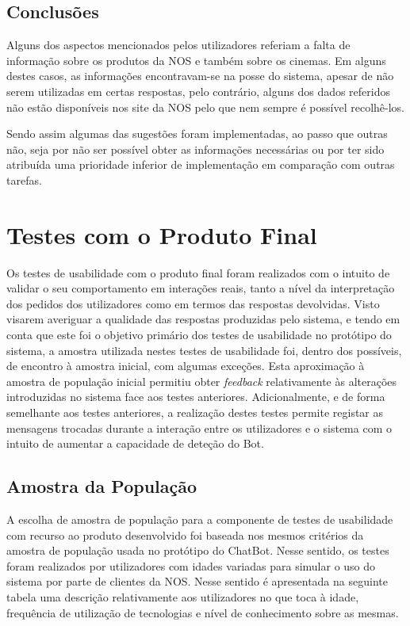 \documentclass[11pt, a4paper]{article}
\begin{document}
\subsection{Conclusões}

Alguns dos aspectos mencionados pelos utilizadores referiam a falta de informação sobre os produtos da NOS e
também sobre os cinemas. Em alguns destes casos, as informações encontravam-se na posse do sistema, apesar
de não serem utilizadas em certas respostas, pelo contrário, alguns dos dados referidos não estão
disponíveis nos site da NOS pelo que nem sempre é possível recolhê-los.

Sendo assim algumas das sugestões foram implementadas, ao passo que outras não, seja por não ser possível
obter as informações necessárias ou por ter sido atribuída uma prioridade inferior de implementação em
comparação com outras tarefas.

\section{Testes com o Produto Final}
Os testes de usabilidade com o produto final foram realizados com o intuito de validar o seu comportamento
em interações reais, tanto a nível da interpretação dos pedidos dos utilizadores como em termos das
respostas devolvidas. Visto visarem averiguar a qualidade das respostas produzidas pelo sistema, e tendo em
conta que este foi o objetivo primário dos testes de usabilidade no protótipo do sistema, a amostra
utilizada nestes testes de usabilidade foi, dentro dos possíveis, de encontro à amostra inicial, com
algumas exceções. Esta aproximação à amostra de população inicial permitiu obter \textit{feedback}
relativamente às alterações introduzidas no sistema face aos testes anteriores. Adicionalmente, e de forma
semelhante aos testes anteriores, a realização destes testes permite registar as mensagens trocadas durante
a interação entre os utilizadores e o sistema com o intuito de aumentar a capacidade de deteção do Bot.

\subsection{Amostra da População}

A escolha de amostra de população para a componente de testes de usabilidade com recurso ao produto desenvolvido foi baseada nos mesmos critérios da amostra de população usada no protótipo do ChatBot. 
Nesse sentido, os testes foram realizados por utilizadores com idades variadas para simular o uso do sistema por parte de clientes da NOS. Nesse sentido é apresentada na seguinte tabela uma descrição relativamente aos utilizadores no que toca à idade, frequência de utilização de tecnologias e nível de conhecimento sobre as mesmas.
\end{document}
